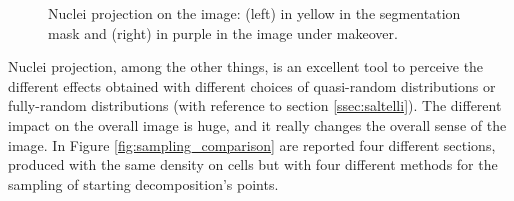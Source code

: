 \begin{description}
\begin{figure}
\begin{subfigure}[t]{0.2\textwidth}
                 \label{fig:nuclei_real}
            \end{subfigure}
            \caption{Nuclei projection on the image: (left) in yellow in the segmentation mask and (right) in purple in the image under makeover.}
            \label{fig:nuclei_proj}
        \end{figure}

        Nuclei projection, among the other things, is an excellent tool to perceive the different effects obtained with different choices of quasi-random distributions or fully-random distributions (with reference to section \ref{ssec:saltelli}). The different impact on the overall image is huge, and it really changes the overall sense of the image. In Figure \ref{fig:sampling_comparison} are reported four different sections, produced with the same density on cells but with four different methods for the sampling of starting decomposition's points.


\end{description}
